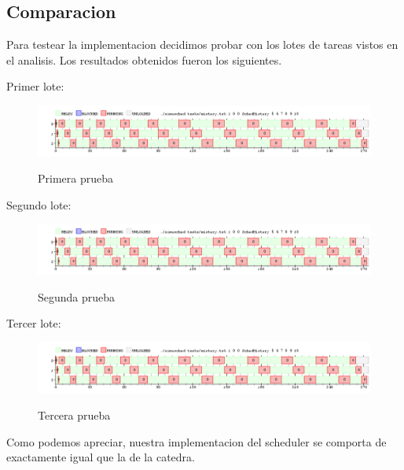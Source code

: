 \subsection{Comparacion}

Para testear la implementacion decidimos probar con los lotes de tareas vistos en el analisis. Los resultados obtenidos fueron los siguientes.

\pagebreak

Primer lote:

\begin{figure}[h]
    \includegraphics[width=\linewidth]{images/mist.png}
    \label{fig:Task Consola}
    \caption{Primera prueba}
\end{figure}

Segundo lote:

\begin{figure}[h]
    \includegraphics[width=\linewidth]{images/mist.png}
    \label{fig:Task Consola}
    \caption{Segunda prueba}
\end{figure}

Tercer lote:

\begin{figure}[h]
    \includegraphics[width=\linewidth]{images/mist.png}
    \label{fig:Task Consola}
    \caption{Tercera prueba}
\end{figure}

Como podemos apreciar, nuestra implementacion del scheduler se comporta de exactamente igual que la de la catedra.

